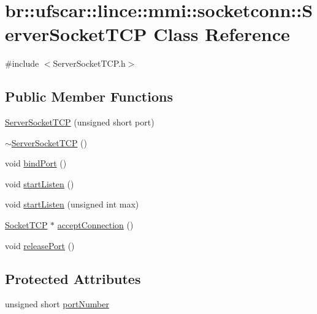 \hypertarget{classbr_1_1ufscar_1_1lince_1_1mmi_1_1socketconn_1_1ServerSocketTCP}{
\section{br::ufscar::lince::mmi::socketconn::ServerSocketTCP Class Reference}
\label{classbr_1_1ufscar_1_1lince_1_1mmi_1_1socketconn_1_1ServerSocketTCP}
}


{\ttfamily \#include $<$ServerSocketTCP.h$>$}

\subsection*{Public Member Functions}
\begin{DoxyCompactItemize}
\item 
\hyperlink{classbr_1_1ufscar_1_1lince_1_1mmi_1_1socketconn_1_1ServerSocketTCP_a333eaf37843a6b92be8409057c0912d4}{ServerSocketTCP} (unsigned short port)
\item 
\hyperlink{classbr_1_1ufscar_1_1lince_1_1mmi_1_1socketconn_1_1ServerSocketTCP_a5fe635a8624663152769239eb15bb32d}{$\sim$ServerSocketTCP} ()
\item 
void \hyperlink{classbr_1_1ufscar_1_1lince_1_1mmi_1_1socketconn_1_1ServerSocketTCP_a178273f9acb926091d947e8824499c39}{bindPort} ()
\item 
void \hyperlink{classbr_1_1ufscar_1_1lince_1_1mmi_1_1socketconn_1_1ServerSocketTCP_a62f72f6e9e59f52bb2166dfe24b96404}{startListen} ()
\item 
void \hyperlink{classbr_1_1ufscar_1_1lince_1_1mmi_1_1socketconn_1_1ServerSocketTCP_a04a980f7cc35bd2c962db3959af74cbe}{startListen} (unsigned int max)
\item 
\hyperlink{classbr_1_1ufscar_1_1lince_1_1mmi_1_1socketconn_1_1SocketTCP}{SocketTCP} $\ast$ \hyperlink{classbr_1_1ufscar_1_1lince_1_1mmi_1_1socketconn_1_1ServerSocketTCP_ae47a3a55c453925c7925787487b0d80b}{acceptConnection} ()
\item 
void \hyperlink{classbr_1_1ufscar_1_1lince_1_1mmi_1_1socketconn_1_1ServerSocketTCP_a1f1be1ca0f733cf4caee8bd93b6a00eb}{releasePort} ()
\end{DoxyCompactItemize}
\subsection*{Protected Attributes}
\begin{DoxyCompactItemize}
\item 
unsigned short \hyperlink{classbr_1_1ufscar_1_1lince_1_1mmi_1_1socketconn_1_1ServerSocketTCP_ac8243d57e2882ed374c0b5c27109ec5e}{portNumber}
\end{DoxyCompactItemize}


